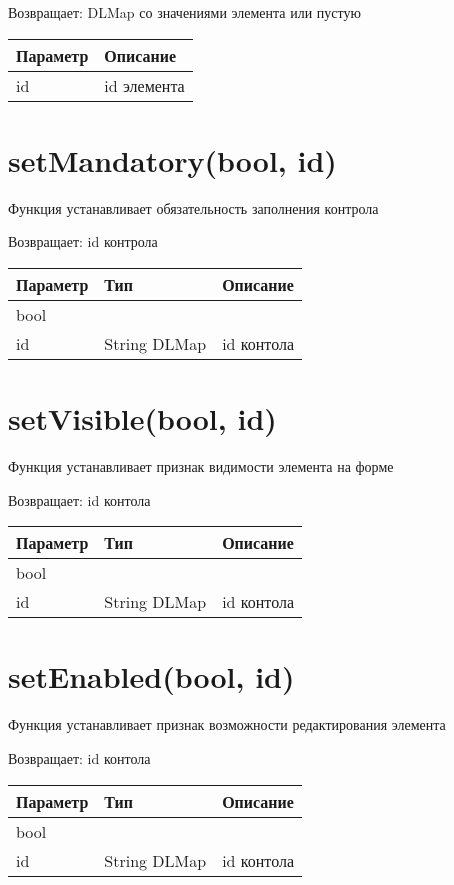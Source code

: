 Возвращает: DLMap со значениями элемента или пустую

\begin{longtable}[]{@{}ll@{}}
\toprule
Параметр & Описание\tabularnewline
\midrule
\endhead
id & id элемента\tabularnewline
\bottomrule
\end{longtable}

\hypertarget{setmandatorybool-id}{%
\section{setMandatory(bool, id)}\label{setmandatorybool-id}}

Функция устанавливает обязательность заполнения контрола

Возвращает: id контрола

\begin{longtable}[]{@{}lll@{}}
\toprule
Параметр & Тип & Описание\tabularnewline
\midrule
\endhead
bool & &\tabularnewline
id & String \textbar{} DLMap & id контола\tabularnewline
\bottomrule
\end{longtable}

\hypertarget{setvisiblebool-id}{%
\section{setVisible(bool, id)}\label{setvisiblebool-id}}

Функция устанавливает признак видимости элемента на форме

Возвращает: id контола

\begin{longtable}[]{@{}lll@{}}
\toprule
Параметр & Тип & Описание\tabularnewline
\midrule
\endhead
bool & &\tabularnewline
id & String \textbar{} DLMap & id контола\tabularnewline
\bottomrule
\end{longtable}

\hypertarget{setenabledbool-id}{%
\section{setEnabled(bool, id)}\label{setenabledbool-id}}

Функция устанавливает признак возможности редактирования элемента

Возвращает: id контола

\begin{longtable}[]{@{}lll@{}}
\toprule
Параметр & Тип & Описание\tabularnewline
\midrule
\endhead
bool & &\tabularnewline
id & String \textbar{} DLMap & id контола\tabularnewline
\bottomrule
\end{longtable}

